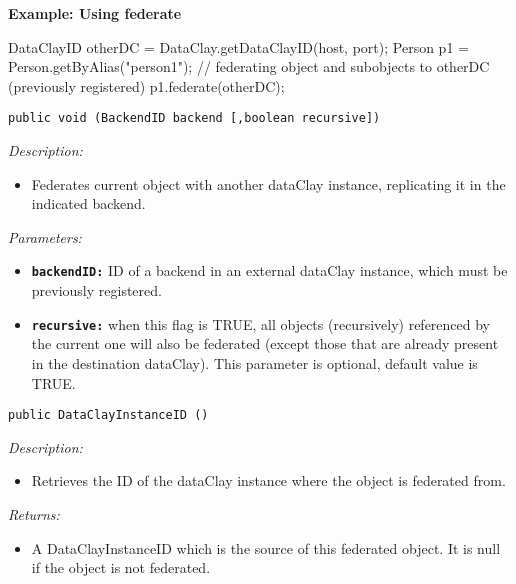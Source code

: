 \begin{tBox}
\textcolor{basecolor} {\bf Example: Using federate}
\begin{java}
DataClayID otherDC = DataClay.getDataClayID(host, port);
Person p1 = Person.getByAlias("person1");
// federating object and subobjects to otherDC (previously registered)
p1.federate(otherDC);
\end{java}
\end{tBox}

\begin{dBox}
\texttt{public void (BackendID backend [,boolean recursive])}
\LINE

{\it Description:}

\begin{itemize}
  \item Federates current object with another dataClay instance, replicating it in the indicated backend. 
\end{itemize}

{\it Parameters:}

\begin{itemize}
  \item \texttt{\bfseries backendID:} ID of a backend in an external dataClay instance, which must be previously registered.
  \item \texttt{\bfseries recursive:} when this flag is TRUE, all objects (recursively) referenced by the current one will also be federated (except those that are already present in the destination dataClay). This parameter is optional, default value is TRUE.
\end{itemize}

\end{dBox}


\begin{dBox}
\texttt{public DataClayInstanceID ()}
\LINE

{\it Description:}

\begin{itemize}
 \item Retrieves the ID of the dataClay instance where the object is federated from. 
\end{itemize}

{\it Returns:}

\begin{itemize}
 \item A DataClayInstanceID which is the source of this federated object.  
 It is null if the object is not federated.
\end{itemize}

\end{dBox}

